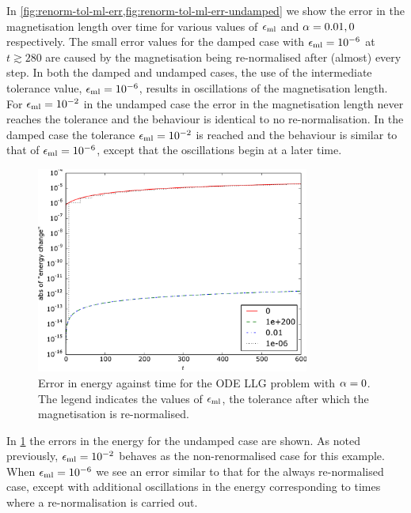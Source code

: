In \cref{fig:renorm-tol-ml-err,fig:renorm-tol-ml-err-undamped} we show the error in the magnetisation length over time for various values of $\epsilon_{\mathrm{ml}}$ and $\alpha=0.01, 0$ respectively.
The small error values for the damped case with $\epsilon_{\mathrm{ml}} = 10^{-6}$ at $t \gtrsim 280$ are caused by the magnetisation being re-normalised after (almost) every step.
In both the damped and undamped cases, the use of the intermediate tolerance value, $\epsilon_{\mathrm{ml}} = 10^{-6}$, results in oscillations of the magnetisation length.
For $\epsilon_{\mathrm{ml}} = 10^{-2}$ in the undamped case the error in the magnetisation length never reaches the tolerance and the behaviour is identical to no re-normalisation.
In the damped case the tolerance $\epsilon_{\mathrm{ml}} = 10^{-2}$ is reached and the behaviour is similar to that of $\epsilon_{\mathrm{ml}} = 10^{-6}$, except that the oscillations begin at a later time.


\begin{figure}
  \centering
  \includegraphics[width=0.8\textwidth]{plots/tolrenorm-geom-properties/0-absofenergychangevstimes.pdf}
  \caption{
    Error in energy against time
    for the ODE LLG problem
    with $\alpha = 0$.
    The legend indicates the values of $\epsilon_{\mathrm{ml}}$, the tolerance after which the magnetisation is re-normalised.
  }
  \label{fig:renorm-tol-energy-err}
\end{figure}

In \cref{fig:renorm-tol-energy-err} the errors in the energy for the undamped case are shown.
As noted previously, $\epsilon_{\mathrm{ml}}= 10^{-2}$ behaves as the non-renormalised case for this example.
When $\epsilon_{\mathrm{ml}} = 10^{-6}$ we see an error similar to that for the always re-normalised case, except with additional oscillations in the energy corresponding to times where a re-normalisation is carried out.


